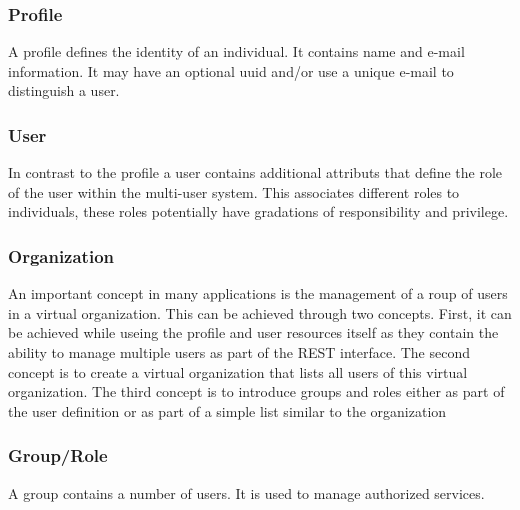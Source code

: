 \documentclass[10pt]{article}
\begin{document}
\subsubsection{Profile}

A profile defines the identity of an individual. It contains name and
e-mail information. It may have an optional uuid and/or use a unique
e-mail to distinguish a user.


\subsubsection{User}

In contrast to the profile a user contains additional attributs that
define the role of the user within the multi-user system. This
associates different roles to individuals, these roles potentially
have gradations of responsibility and privilege.



\subsubsection{Organization}

An important concept in many applications is the management of a roup
of users in a virtual organization. This can be achieved through two
concepts. First, it can be achieved while useing the profile and user
resources itself as they contain the ability to manage multiple users
as part of the REST interface. The second concept is to create a
virtual organization that lists all users of this virtual
organization. The third concept is to introduce groups and roles
either as part of the user definition or as part of a simple list
similar to the organization



\subsubsection{Group/Role}

A group contains a number of users. It is used to manage authorized
services.
\end{document}
